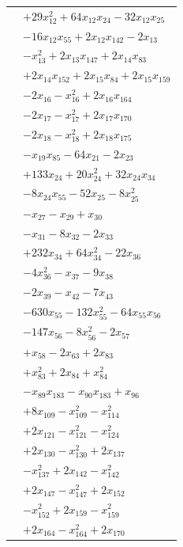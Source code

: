 \begin{longtable}{@{}r@{\;}l@{}}
 & \(\displaystyle +29x_{12}^{2} +64x_{12}x_{24} -32x_{12}x_{25}\) \\
 & \(\displaystyle -16x_{12}x_{55} +2x_{12}x_{142} -2x_{13}\) \\
 & \(\displaystyle -x_{13}^{2} +2x_{13}x_{147} +2x_{14}x_{83}\) \\
 & \(\displaystyle +2x_{14}x_{152} +2x_{15}x_{84} +2x_{15}x_{159}\) \\
 & \(\displaystyle -2x_{16} -x_{16}^{2} +2x_{16}x_{164}\) \\
 & \(\displaystyle -2x_{17} -x_{17}^{2} +2x_{17}x_{170}\) \\
 & \(\displaystyle -2x_{18} -x_{18}^{2} +2x_{18}x_{175}\) \\
 & \(\displaystyle -x_{19}x_{85} -64x_{21} -2x_{23}\) \\
 & \(\displaystyle +133x_{24} +20x_{24}^{2} +32x_{24}x_{34}\) \\
 & \(\displaystyle -8x_{24}x_{55} -52x_{25} -8x_{25}^{2}\) \\
 & \(\displaystyle -x_{27} -x_{29} +x_{30}\) \\
 & \(\displaystyle -x_{31} -8x_{32} -2x_{33}\) \\
 & \(\displaystyle +232x_{34} +64x_{34}^{2} -22x_{36}\) \\
 & \(\displaystyle -4x_{36}^{2} -x_{37} -9x_{38}\) \\
 & \(\displaystyle -2x_{39} -x_{42} -7x_{43}\) \\
 & \(\displaystyle -630x_{55} -132x_{55}^{2} -64x_{55}x_{56}\) \\
 & \(\displaystyle -147x_{56} -8x_{56}^{2} -2x_{57}\) \\
 & \(\displaystyle +x_{58} -2x_{63} +2x_{83}\) \\
 & \(\displaystyle +x_{83}^{2} +2x_{84} +x_{84}^{2}\) \\
 & \(\displaystyle -x_{89}x_{183} -x_{90}x_{183} +x_{96}\) \\
 & \(\displaystyle +8x_{109} -x_{109}^{2} -x_{114}^{2}\) \\
 & \(\displaystyle +2x_{121} -x_{121}^{2} -x_{124}^{2}\) \\
 & \(\displaystyle +2x_{130} -x_{130}^{2} +2x_{137}\) \\
 & \(\displaystyle -x_{137}^{2} +2x_{142} -x_{142}^{2}\) \\
 & \(\displaystyle +2x_{147} -x_{147}^{2} +2x_{152}\) \\
 & \(\displaystyle -x_{152}^{2} +2x_{159} -x_{159}^{2}\) \\
 & \(\displaystyle +2x_{164} -x_{164}^{2} +2x_{170}\) \\

\end{longtable}
